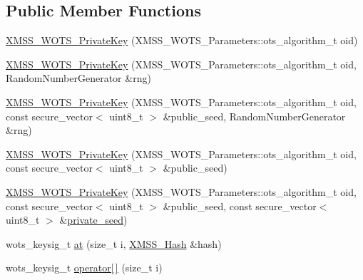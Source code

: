 \subsection*{Public Member Functions}
\begin{DoxyCompactItemize}
\item 
\mbox{\hyperlink{class_botan_1_1_x_m_s_s___w_o_t_s___private_key_a2f1058b65a5dfc523afd1f7bc93297a2}{X\+M\+S\+S\+\_\+\+W\+O\+T\+S\+\_\+\+Private\+Key}} (X\+M\+S\+S\+\_\+\+W\+O\+T\+S\+\_\+\+Parameters\+::ots\+\_\+algorithm\+\_\+t oid)
\item 
\mbox{\hyperlink{class_botan_1_1_x_m_s_s___w_o_t_s___private_key_ab327590ef27314723fd71cfc1cdfaef2}{X\+M\+S\+S\+\_\+\+W\+O\+T\+S\+\_\+\+Private\+Key}} (X\+M\+S\+S\+\_\+\+W\+O\+T\+S\+\_\+\+Parameters\+::ots\+\_\+algorithm\+\_\+t oid, Random\+Number\+Generator \&rng)
\item 
\mbox{\hyperlink{class_botan_1_1_x_m_s_s___w_o_t_s___private_key_af1f9f24679ab1138032165f56cf3e9cd}{X\+M\+S\+S\+\_\+\+W\+O\+T\+S\+\_\+\+Private\+Key}} (X\+M\+S\+S\+\_\+\+W\+O\+T\+S\+\_\+\+Parameters\+::ots\+\_\+algorithm\+\_\+t oid, const secure\+\_\+vector$<$ uint8\+\_\+t $>$ \&public\+\_\+seed, Random\+Number\+Generator \&rng)
\item 
\mbox{\hyperlink{class_botan_1_1_x_m_s_s___w_o_t_s___private_key_ac090ca809dbcf80cdbd4ef6529d58e09}{X\+M\+S\+S\+\_\+\+W\+O\+T\+S\+\_\+\+Private\+Key}} (X\+M\+S\+S\+\_\+\+W\+O\+T\+S\+\_\+\+Parameters\+::ots\+\_\+algorithm\+\_\+t oid, const secure\+\_\+vector$<$ uint8\+\_\+t $>$ \&public\+\_\+seed)
\item 
\mbox{\hyperlink{class_botan_1_1_x_m_s_s___w_o_t_s___private_key_aadd32d2c3fb5045d5a1cec31d85cdbce}{X\+M\+S\+S\+\_\+\+W\+O\+T\+S\+\_\+\+Private\+Key}} (X\+M\+S\+S\+\_\+\+W\+O\+T\+S\+\_\+\+Parameters\+::ots\+\_\+algorithm\+\_\+t oid, const secure\+\_\+vector$<$ uint8\+\_\+t $>$ \&public\+\_\+seed, const secure\+\_\+vector$<$ uint8\+\_\+t $>$ \&\mbox{\hyperlink{class_botan_1_1_x_m_s_s___w_o_t_s___private_key_a401b9dde3140edf386dba700b880b265}{private\+\_\+seed}})
\item 
wots\+\_\+keysig\+\_\+t \mbox{\hyperlink{class_botan_1_1_x_m_s_s___w_o_t_s___private_key_ac79a078ba4db7829e1065721c8980cfa}{at}} (size\+\_\+t i, \mbox{\hyperlink{class_botan_1_1_x_m_s_s___hash}{X\+M\+S\+S\+\_\+\+Hash}} \&hash)
\item 
wots\+\_\+keysig\+\_\+t \mbox{\hyperlink{class_botan_1_1_x_m_s_s___w_o_t_s___private_key_ae80b5d24e94411aa807ba31e6662658e}{operator\mbox{[}$\,$\mbox{]}}} (size\+\_\+t i)
\item 

\end{DoxyCompactItemize}
